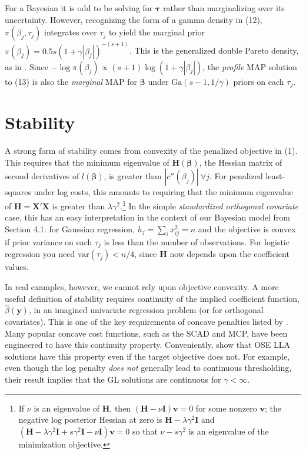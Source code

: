 \documentclass[12pt]{article}
\newcommand{\bs}[1]{\boldsymbol{#1}}
\newcommand{\mr}[1]{\mathrm{#1}}
\newcommand{\bm}[1]{\mathbf{#1}}
\begin{document}
For a Bayesian it is odd to be solving for $\bs{\tau}$ rather than
marginalizing over its uncertainty.  However, recognizing the form of a gamma
density  in (12), $\pi(\beta_j,\tau_j)$ integrates over $\tau_j$ to
yield the marginal prior $ \pi(\beta_j) = 0.5s\left( 1+
\gamma|\beta_j|\right)^{-(s+1)}$. This is the generalized double Pareto
density, as in  \citet{armagan_generalized_2013}. Since $-\log \pi(\beta_j)
\propto (s+1)\log(1 + \gamma|\beta_j|)$, the {\it profile} MAP solution to
(13) is also the {\it marginal} MAP for
$\bs{\beta}$ under $\mr{Ga}(s-1,1/\gamma)$ priors on each $\tau_j$.




\section{Stability}

A strong form of stability comes from convexity of the penalized objective in
(1). This requires that the minimum eigenvalue of
$\bm{H}(\bs{\beta})$, the Hessian matrix of second derivatives of
$l(\bs{\beta})$, is greater than $|c''(\beta_j)| ~\forall j$.  For penalized
least-squares under log costs, this amounts to requiring that the minimum
eigenvalue of $\bm{H} = \bm{X}'\bm{X}$ is greater than
$\lambda\gamma^2$.\footnote{ If $\nu$ is an eigenvalue of $\bm{H}$, then
$(\bm{H} -
\nu \bm{I})\bm{v} = 0$ for some nonzero $\bm{v}$; the negative log posterior
Hessian at zero is $\bm{H} - \lambda\gamma^2\bm{I}$ and $(\bm{H} -
\lambda\gamma^2\bm{I} + s\gamma^2\bm{I} -
\nu \bm{I})\bm{v} = 0$ so that 
$\nu - s\gamma^2$ is an eigenvalue of the minimization objective.  }  In the
simple {\it standardized orthogonal covariate} case, this has an easy
interpretation in the context of our Bayesian model from Section 4.1:
for Gaussian regression, $h_j = \sum_i x_{ij}^2 = n$ and the objective is
convex if prior variance on each $\tau_j$  is less than the number of
observations.  For logistic regression you need $\mr{var}(\tau_j) < n/4$,
since $\bm{H}$ now depends upon the coefficient values.

In real examples, however, we cannot rely upon objective convexity. A more
useful definition of stability requires continuity of the implied  coefficient
function, $\hat\beta(\bm{y})$, in an imagined univariate regression problem
(or for orthogonal covariates).  This is one of the key requirements of
concave penalties listed by \citet{fan_variable_2001}. Many popular concave
cost functions, such as the SCAD and MCP, have been engineered to have this
continuity property. Conveniently, \cite{zou_one-step_2008} show that OSE LLA
solutions have this property even if the target objective does not.  For
example, even though the log penalty {\it does not} generally lead to
continuous thresholding, their result implies that the GL solutions are
continuous for $\gamma<\infty$.
\end{document}
